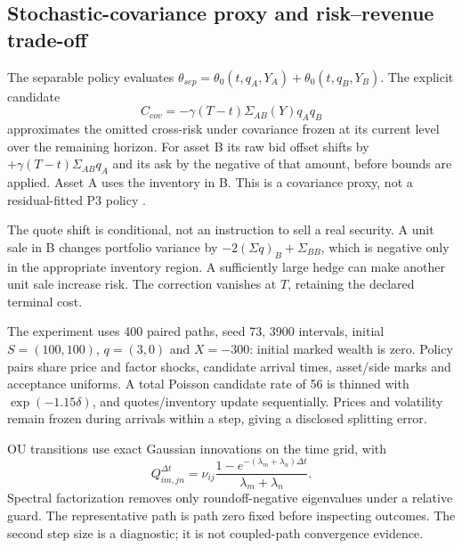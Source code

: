 \subsection{Stochastic-covariance proxy and risk--revenue trade-off}

The separable policy evaluates $\theta_{sep}=\theta_0(t,q_A,Y_A)+\theta_0(t,q_B,Y_B)$. The explicit candidate
\[
 C_{cov}=-\gamma(T-t)\Sigma_{AB}(Y)q_Aq_B
\]
approximates the omitted cross-risk under covariance frozen at its current level over the remaining horizon. For asset B its raw bid offset shifts by $+\gamma(T-t)\Sigma_{AB}q_A$ and its ask by the negative of that amount, before bounds are applied. Asset A uses the inventory in B. This is a covariance proxy, not a residual-fitted P3 policy \cite{BergaultEvangelistaGueantVieira2022,multifactor}.

The quote shift is conditional, not an instruction to sell a real security. A unit sale in B changes portfolio variance by $-2(\Sigma q)_B+\Sigma_{BB}$, which is negative only in the appropriate inventory region. A sufficiently large hedge can make another unit sale increase risk. The correction vanishes at $T$, retaining the declared terminal cost.

The experiment uses 400 paired paths, seed 73, 3900 intervals, initial $S=(100,100)$, $q=(3,0)$ and $X=-300$: initial marked wealth is zero. Policy pairs share price and factor shocks, candidate arrival times, asset/side marks and acceptance uniforms. A total Poisson candidate rate of 56 is thinned with $\exp(-1.15\delta)$, and quotes/inventory update sequentially. Prices and volatility remain frozen during arrivals within a step, giving a disclosed splitting error.

OU transitions use exact Gaussian innovations on the time grid, with
\[
 Q^{\Delta t}_{im,jn}=\nu_{ij}\frac{1-e^{-(\lambda_m+\lambda_n)\Delta t}}{\lambda_m+\lambda_n}.
\]
Spectral factorization removes only roundoff-negative eigenvalues under a relative guard. The representative path is path zero fixed before inspecting outcomes. The second step size is a diagnostic; it is not coupled-path convergence evidence.

